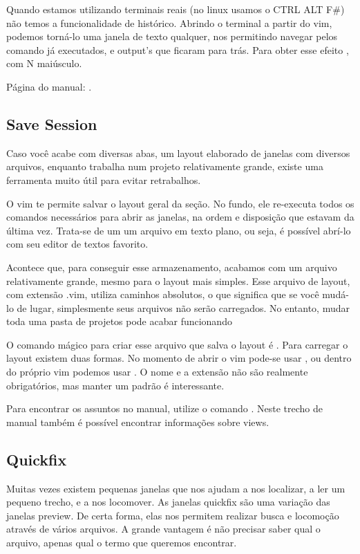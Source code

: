 Quando estamos utilizando terminais reais (no linux usamos o CTRL ALT F\#)
não temos a funcionalidade de histórico.
Abrindo o terminal a partir do vim, podemos torná-lo uma janela de texto qualquer,
nos permitindo navegar pelos comando já executados, e output's que ficaram para trás.
Para obter esse efeito , com N maiúsculo.

Página do manual: .

\subsection{Save Session}
Caso você acabe com diversas abas, um layout elaborado de janelas com diversos arquivos,
enquanto trabalha num projeto relativamente grande, existe uma ferramenta muito útil para evitar
retrabalhos.

O vim te permite salvar o layout geral da seção.
No fundo, ele re-executa todos os comandos necessários para abrir as janelas,
na ordem e disposição que estavam da última vez.
Trata-se de um um arquivo em texto plano, ou seja, é possível abrí-lo com seu editor de textos favorito.

Acontece que, para conseguir esse armazenamento, acabamos com um arquivo relativamente grande,
mesmo para o layout mais simples.
Esse arquivo de layout, com extensão .vim, utiliza caminhos absolutos,
o que significa que se você mudá-lo de lugar, simplesmente seus arquivos não serão carregados.
No entanto, mudar toda uma pasta de projetos pode acabar funcionando

O comando mágico para criar esse arquivo que salva o layout é .
Para carregar o layout existem duas formas.
No momento de abrir o vim pode-se usar , ou dentro do próprio vim
podemos usar .
O nome e a extensão não são realmente obrigatórios, mas manter um padrão é interessante.

Para encontrar os assuntos no manual, utilize o comando .
Neste trecho de manual também é possível encontrar informações sobre views.

\subsection{Quickfix}
Muitas vezes existem pequenas janelas que nos ajudam a nos localizar, a ler um pequeno trecho, e a nos locomover.
As janelas quickfix são uma variação das janelas preview.
De certa forma, elas nos permitem realizar busca e locomoção através de vários arquivos.
A grande vantagem é não precisar saber qual o arquivo, apenas qual o termo que queremos encontrar.

